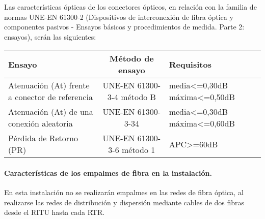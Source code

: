 Las características ópticas de los conectores ópticos, en relación con la familia de normas UNE-EN 61300-2 (Dispositivos de interconexión de fibra óptica y componentes pasivos - Ensayos básicos y procedimientos de medida. Parte 2: ensayos), serán las siguientes:

\begin{tabular}{| p{4cm}| c | p{3cm} |}
	\hline
	Ensayo & Método de ensayo & Requisitos \\
	\hline
	Atenuación (At) frente a conector de referencia & UNE-EN 61300-3-4 método B & media<=0,30dB máxima<=0,50dB \\
	\hline
	Atenuación (At) de una conexión aleatoria & UNE-EN 61300-3-34 & media<=0,30dB máxima<=0,60dB\\
	\hline
	Pérdida de Retorno (PR) & UNE-EN 61300-3-6 método 1 & APC>=60dB\\
	\hline
\end{tabular}
\paragraph{Características de los empalmes de fibra en la instalación.}
En esta instalación no se realizarán empalmes en las redes de fibra óptica, al realizarse las redes de distribución y dispersión mediante cables de dos fibras desde el RITU hasta cada RTR.
